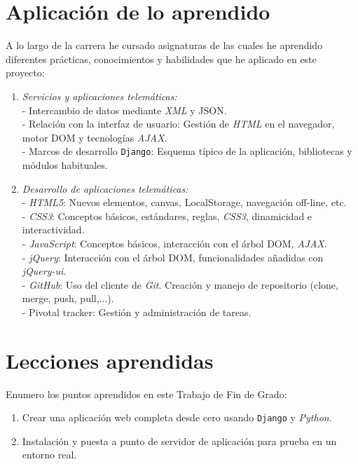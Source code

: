 \documentclass[a4paper, 12pt]{book}
\begin{document}
\section{Aplicaci\'on de lo aprendido}
\label{sec:aplicacion}
A lo largo de la carrera he cursado asignaturas de las cuales he aprendido diferentes pr\'acticas, conocimientos y habilidades que he aplicado en este proyecto:
\begin{enumerate}
  \item \textit{Servicios y aplicaciones telem\'aticas:}\\
  - Intercambio de datos mediante \textit{XML} y JSON.\\
  - Relaci\'on con la interfaz de usuario: Gesti\'on de \textit{HTML} en el navegador, motor DOM y tecnolog\'ias \textit{AJAX}.\\
  - Marcos de desarrollo \texttt{Django}: Esquema t\'ipico de la aplicaci\'on, bibliotecas y m\'odulos habituales.
  \item \textit{Desarrollo de aplicaciones telem\'aticas:}\\
  - \textit{HTML5}: Nuevos elementos, canvas, LocalStorage, navegaci\'on off-line, etc.\\
  - \textit{CSS3}: Conceptos b\'asicos, est\'andares, reglas, \textit{CSS3}, dinamicidad e interactividad.\\
  - \textit{JavaScript}: Conceptos b\'asicos, interacci\'on con el \'arbol DOM, \textit{AJAX}.\\
  - \textit{jQuery}: Interacci\'on con el \'arbol DOM, funcionalidades a\~nadidas con \textit{jQuery-ui}.\\
  - \textit{GitHub}: Uso del cliente de \textit{Git}. Creaci\'on y manejo de repositorio (clone, merge, push, pull,...).\\
  - Pivotal tracker: Gesti\'on y administraci\'on de tareas.\\
\end{enumerate}


\section{Lecciones aprendidas}
\label{sec:lecciones_aprendidas}
Enumero los puntos aprendidos en este Trabajo de Fin de Grado:
\begin{enumerate}
  \item Crear una aplicaci\'on web completa desde cero usando \texttt{Django} y \textit{Python}.
  \item Instalaci\'on y puesta a punto de servidor de aplicaci\'on para prueba en un entorno real.
\end{enumerate}
\end{document}
